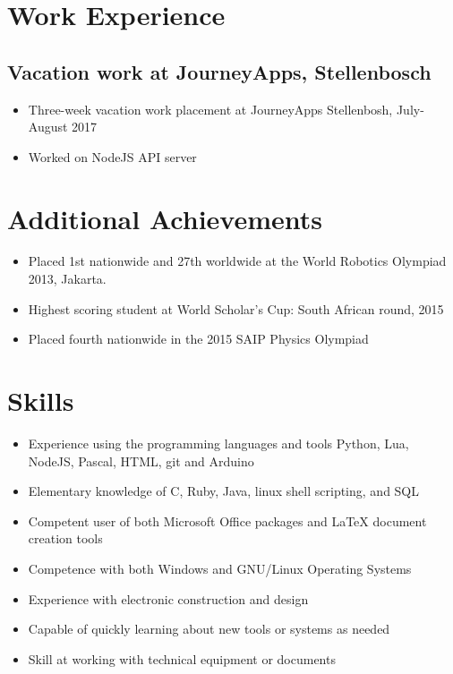 \documentclass[12pt,a4paper,notitlepage]{article}
\begin{document}
\section*{Work Experience}
\subsection*{Vacation work at JourneyApps, Stellenbosch}
\begin{itemize}
\item Three-week vacation work placement at JourneyApps Stellenbosh, July-August 2017
\item Worked on NodeJS API server
\end{itemize}

\section*{Additional Achievements}
\begin{itemize}
\item Placed 1st nationwide and 27th worldwide at the World Robotics Olympiad 2013, Jakarta.
\item Highest scoring student at World Scholar's Cup: South African round, 2015
\item Placed fourth nationwide in the 2015 SAIP Physics Olympiad
\end{itemize}

\section*{Skills}
\begin{itemize}
\item Experience using the programming languages and tools Python, Lua, NodeJS, Pascal, HTML, git and Arduino
\item Elementary knowledge of C, Ruby, Java, linux shell scripting, and SQL
\item Competent user of both Microsoft Office packages and LaTeX document creation tools
\item Competence with both Windows and GNU/Linux Operating Systems
\item Experience with electronic construction and design
\item Capable of quickly learning about new tools or systems as needed
\item Skill at working with technical equipment or documents
\end{itemize}
\end{document}
